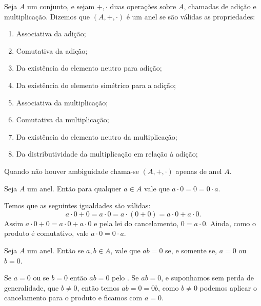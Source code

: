 \documentclass[../main.tex]{subfiles}
\begin{document}



\begin{defi}\label{agb-def-anel}
    Seja $A$ um conjunto, e sejam $+, \cdot$ duas operações sobre $A$, chamadas de adição e multiplicação. Dizemos que $(A, +, \cdot)$ é um anel se são válidas as propriedades:
    \begin{enumerate}[label=(\roman*)]
        \item Associativa da adição;
        \item Comutativa da adição;
        \item Da existência do elemento neutro para adição;
        \item Da existência do elemento simétrico para a adição;
        \item Associativa da multiplicação;
        \item Comutativa da multiplicação;
        \item Da existência do elemento neutro da multiplicação;
        \item Da distributividade da multiplicação em relação à adição;
    \end{enumerate}
    Quando não houver ambiguidade chama-se $(A,+,\cdot)$ apenas de anel $A$.
\end{defi}



\begin{teo}\label{agb-teo-anulamentoProduto1}
    Seja $A$ um anel. Então para qualquer $a \in A$ vale que $a \cdot 0 = 0 = 0 \cdot a$.
\end{teo}
\begin{dem}
 Temos que as seguintes igualdades são válidas: 
    \[a \cdot 0+0 = a \cdot 0 = a \cdot (0+0) = a \cdot 0+a \cdot 0.\] 
    Assim $a \cdot 0+0 = a \cdot 0+a \cdot 0$ e pela lei do cancelamento, $0=a \cdot 0$. Ainda, como o produto é comutativo, vale $a \cdot 0=0 \cdot a$.
\end{dem}

\begin{teo}\label{agb-teo-anulamentoProduto2}
    Seja $A$ um anel. Então se $a,b \in A$, vale que $ab = 0$ se, e somente se, $a = 0$ ou $b = 0$.
\end{teo}
\begin{dem}
    Se $a = 0$ ou se $b=0$ então $ab = 0$ pelo .
    Se $ab=0$, e suponhamos sem perda de generalidade, que $b \neq 0$, então temos $ab = 0 = 0b$, como $b \neq 0$ podemos aplicar o cancelamento para o produto e ficamos com $a=0$.
\end{dem}
\end{document}
